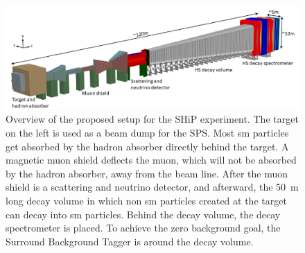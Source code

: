 \begin{figure}
	\centering
	\includegraphics[width=1.\textwidth]{pictures/ship_sketch}
	\caption[Overview of the SHiP experiment.]{Overview of the proposed setup for the SHiP experiment. The target on the left is used as a beam dump for the SPS. Most \ac{sm} particles get absorbed by the hadron absorber directly behind the target. A magnetic muon shield deflects the muon, which will not be absorbed by the hadron absorber, away from the beam line. After the muon shield is a scattering and neutrino detector, and afterward, the \SI{50}{\meter} long decay volume in which non \ac{sm} particles created at the target can decay into \ac{sm} particles. Behind the decay volume, the decay spectrometer is placed. To achieve the zero background goal, the Surround Background Tagger is around the decay volume. \cite{ship_coll}}
	\label{fig:ship_sketch}
\end{figure}

